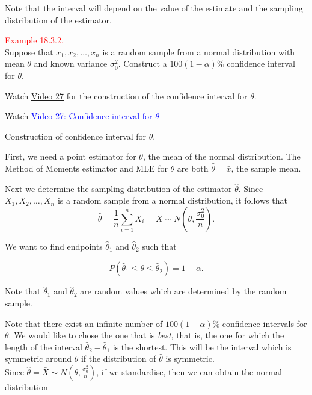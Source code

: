\documentclass[
]{book}
\begin{document}
Note that the interval will depend on the value of the estimate and the sampling distribution of the estimator.

\leavevmode{}%
\textcolor{red}{Example 18.3.2.}\\
Suppose that \(x_1,x_2,\dots,x_n\) is a random sample from a normal distribution with mean \(\theta\) and known variance \(\sigma_0^2\). Construct a \(100(1-\alpha)\%\) confidence interval for \(\theta\).

Watch \protect\hyperlink{video27}{Video 27} for the construction of the confidence interval for \(\theta\).

Watch \href{https://mediaspace.nottingham.ac.uk/media/Confidence+Interval+FINAL+VERSION/1_ff9ijz9t}{\textcolor{blue}{Video 27: Confidence interval for $\theta$}}

Construction of confidence interval for \(\theta\).

First, we need a point estimator for \(\theta\), the mean of the normal distribution. The Method of Moments estimator and MLE for \(\theta\) are both \(\hat{\theta}=\bar{x}\), the sample mean.

Next we determine the sampling distribution of the estimator \(\hat{\theta}\). Since \(X_1,X_2,\dots,X_n\) is a random sample from a normal distribution, it follows that\\

\[\hat{\theta} = \frac{1}{n} \sum_{i=1}^n X_i = \bar{X} \sim N \left( \theta, \frac{\sigma_0^2}{n} \right).\]

We want to find endpoints \(\hat{\theta}_1\) and \(\hat{\theta}_2\) such that

\[P \left( \hat{\theta}_1 \leq \theta \leq \hat{\theta}_2 \right) = 1-\alpha. \]

Note that \(\hat{\theta}_1\) and \(\hat{\theta}_2\) are random values which are determined by the random sample.

Note that there exist an infinite number of \(100(1-\alpha)\%\) confidence intervals for \(\theta\). We would like to chose the one that is \emph{best}, that is, the one for which the length of the interval \(\hat{\theta}_2-\hat{\theta}_1\) is the shortest. This will be the interval which is symmetric around \(\theta\) if the distribution of \(\hat{\theta}\) is symmetric.\\

Since \(\hat{\theta} = \bar{X} \sim N \left( \theta, \frac{\sigma_0^2}{n} \right)\), if we standardise, then we can obtain the normal distribution\\
\end{document}
